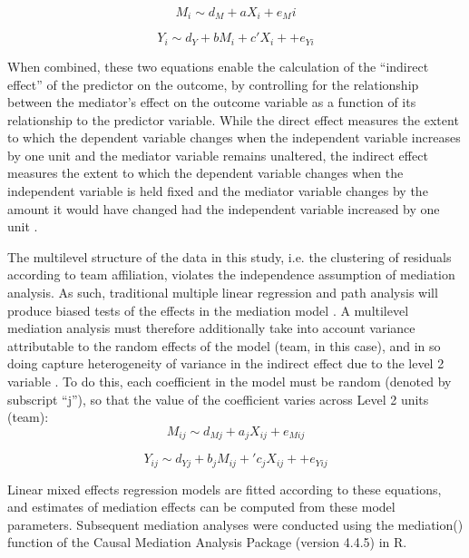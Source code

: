 \documentclass[12pt]{report}
\begin{document}
{\begin{equation}
  M_i \sim d_M + aX_i + e_Mi
\end{equation}

\begin{equation}
  Y_i \sim d_Y + bM_i + c'X_i +  + e_{Yi}
\end{equation}
\bigskip

When combined, these two equations enable the calculation of the ``indirect effect'' of the predictor on the outcome, by controlling for the relationship between the mediator's effect on the outcome variable as a function of its relationship to the predictor variable.  While the direct effect measures the extent to which the dependent variable changes when the independent variable increases by one unit and the mediator variable remains unaltered, the indirect effect measures the extent to which the dependent variable changes when the independent variable is held fixed and the mediator variable changes by the amount it would have changed had the independent variable increased by one unit \citep{Bauer2006}.

The multilevel structure of the data in this study, i.e. the clustering of residuals according to team affiliation, violates the independence assumption of mediation analysis. As such, traditional multiple linear regression and path analysis will produce biased tests of the effects in the mediation model \citep{Raudenbush2002}.
A multilevel mediation analysis must therefore additionally take into account variance attributable to the random effects of the model (team, in this case), and in so doing capture heterogeneity of variance in the indirect effect due to the level 2 variable \citep{Tofighi2014}.  To do this, each coefficient in the model must be random (denoted by subscript ``j''), so that the value of the coefficient varies across Level 2 units (team): \\

\begin{equation}
  M_{ij} \sim d_{Mj} + a_jX_{ij} + e_{Mij}
\end{equation}

\begin{equation}
  Y_{ij} \sim d_{Yj} + b_jM_{ij} + 'c_jX_{ij} +  + e_{Yij}
\end{equation}
\bigskip

Linear mixed effects regression models are fitted according to these equations, and estimates of mediation effects can be computed from these model parameters.  Subsequent mediation analyses were conducted using the mediation() function of the Causal Mediation Analysis Package (version 4.4.5) in R.

}
\end{document}
